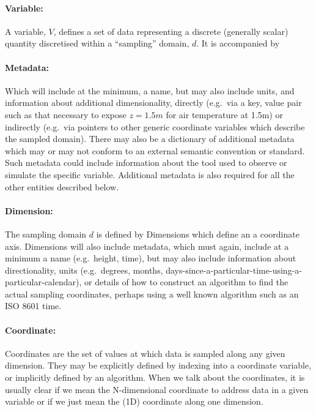\paragraph{Variable:}%
\label{variable}

A variable, \(V\), defines a set of data representing a discrete (generally scalar) quantity discretised within a ``sampling'' domain, \(d\). It is accompanied by

\paragraph{Metadata:}%
\label{metadata}

Which will include at the minimum, a name, but may also include units, and information about additional dimensionality, directly (e.g.~via a key, value pair such as that necessary to expose \(z=1.5m\) for air temperature at 1.5m) or indirectly (e.g.~via pointers to other generic coordinate variables which describe the sampled domain). 
There may also be a dictionary of additional metadata which may or may not conform to an external semantic convention or standard. 
Such metadata could include information about the tool used to observe or simulate the specific variable. 
Additional metadata is also required for all the other entities described below.

\paragraph{Dimension:}%
\label{dimension}

The sampling domain \(d\) is defined by Dimensions which define an a coordinate axis. 
Dimensions will also include metadata, which must again, include at a minimum a name (e.g.~height, time), but may also include information about directionality, units (e.g.~degrees, months, days-since-a-particular-time-using-a-particular-calendar), or details of how to construct an algorithm to find the actual sampling coordinates, perhaps using a well known algorithm such as an ISO 8601 time.

\paragraph{Coordinate:}%
\label{coordinate}

Coordinates are the set of values at which data is sampled along any given dimension. 
They may be explicitly defined by indexing into a coordinate variable, or implicitly defined by an algorithm. 
When we talk about the coordinates, it is usually clear if we mean the N-dimensional coordinate to address data in a given variable or if we just mean the (1D) coordinate along one dimension.

